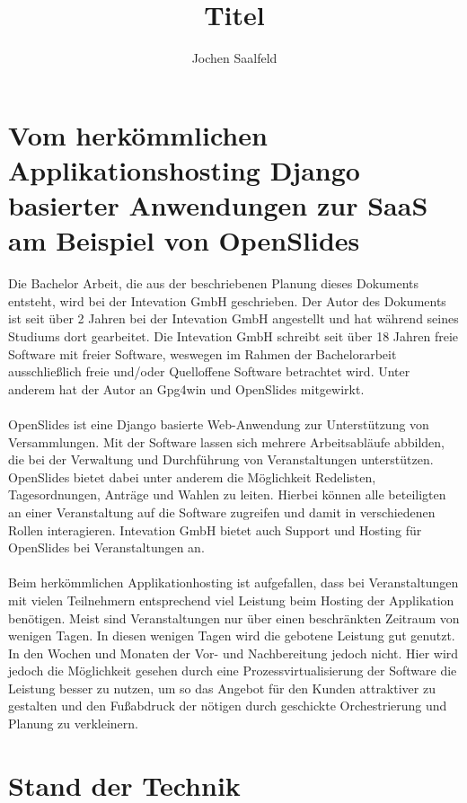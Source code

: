 \documentclass[a4paper]{article}
\title{Titel}
\author{Jochen Saalfeld}
\begin{document}
\section*{Vom herkömmlichen Applikationshosting Django basierter Anwendungen 
zur \acf{SaaS} am Beispiel von OpenSlides}
Die Bachelor Arbeit, die aus der beschriebenen Planung dieses Dokuments 
entsteht, wird bei der Intevation GmbH\cite{inte} geschrieben. Der Autor des 
Dokuments ist seit über 2 Jahren bei der Intevation GmbH angestellt und hat 
während seines Studiums dort gearbeitet. Die Intevation GmbH schreibt seit über 
18 Jahren freie Software mit freier Software, weswegen im Rahmen der 
Bachelorarbeit ausschließlich freie und/oder Quelloffene Software betrachtet 
wird. Unter anderem hat der Autor an Gpg4win\cite{gpg4win} und 
OpenSlides\cite{oshp} mitgewirkt.\\
\\
OpenSlides ist eine Django\cite{djangohp} basierte Web-Anwendung zur 
Unterstützung von 
Versammlungen. Mit der Software lassen sich mehrere Arbeitsabläufe abbilden, 
die bei der Verwaltung und Durchführung von Veranstaltungen unterstützen. 
OpenSlides bietet dabei unter anderem die Möglichkeit Redelisten, 
Tagesordnungen, Anträge und Wahlen zu leiten. Hierbei können alle beteiligten 
an einer Veranstaltung auf die Software zugreifen und damit in verschiedenen 
Rollen interagieren\cite{oshp}. Intevation GmbH bietet auch Support und Hosting 
für OpenSlides bei Veranstaltungen an\cite{oscom}.\\
\\
Beim herkömmlichen Applikationhosting ist aufgefallen, dass bei Veranstaltungen 
mit vielen Teilnehmern entsprechend viel Leistung beim Hosting der Applikation 
benötigen. Meist sind Veranstaltungen nur über einen beschränkten Zeitraum von 
wenigen Tagen. In diesen wenigen Tagen wird die gebotene Leistung gut genutzt. 
In den Wochen und Monaten der Vor- und Nachbereitung jedoch nicht. Hier wird 
jedoch die Möglichkeit gesehen durch eine Prozessvirtualisierung der Software 
die Leistung besser zu nutzen, um so das Angebot für den Kunden attraktiver zu 
gestalten und den Fußabdruck der nötigen durch geschickte Orchestrierung und 
Planung zu verkleinern.
\section{Stand der Technik} \label{sec:sdt}
\end{document}
